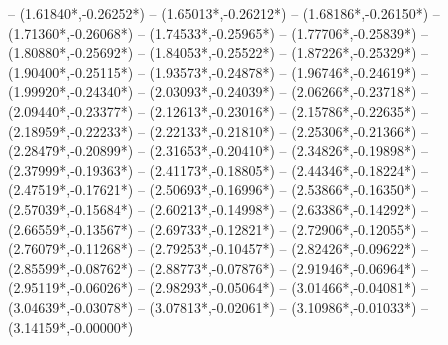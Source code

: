 {	-- ({1.61840*\dx},{-0.26252*\dy})
	-- ({1.65013*\dx},{-0.26212*\dy})
	-- ({1.68186*\dx},{-0.26150*\dy})
	-- ({1.71360*\dx},{-0.26068*\dy})
	-- ({1.74533*\dx},{-0.25965*\dy})
	-- ({1.77706*\dx},{-0.25839*\dy})
	-- ({1.80880*\dx},{-0.25692*\dy})
	-- ({1.84053*\dx},{-0.25522*\dy})
	-- ({1.87226*\dx},{-0.25329*\dy})
	-- ({1.90400*\dx},{-0.25115*\dy})
	-- ({1.93573*\dx},{-0.24878*\dy})
	-- ({1.96746*\dx},{-0.24619*\dy})
	-- ({1.99920*\dx},{-0.24340*\dy})
	-- ({2.03093*\dx},{-0.24039*\dy})
	-- ({2.06266*\dx},{-0.23718*\dy})
	-- ({2.09440*\dx},{-0.23377*\dy})
	-- ({2.12613*\dx},{-0.23016*\dy})
	-- ({2.15786*\dx},{-0.22635*\dy})
	-- ({2.18959*\dx},{-0.22233*\dy})
	-- ({2.22133*\dx},{-0.21810*\dy})
	-- ({2.25306*\dx},{-0.21366*\dy})
	-- ({2.28479*\dx},{-0.20899*\dy})
	-- ({2.31653*\dx},{-0.20410*\dy})
	-- ({2.34826*\dx},{-0.19898*\dy})
	-- ({2.37999*\dx},{-0.19363*\dy})
	-- ({2.41173*\dx},{-0.18805*\dy})
	-- ({2.44346*\dx},{-0.18224*\dy})
	-- ({2.47519*\dx},{-0.17621*\dy})
	-- ({2.50693*\dx},{-0.16996*\dy})
	-- ({2.53866*\dx},{-0.16350*\dy})
	-- ({2.57039*\dx},{-0.15684*\dy})
	-- ({2.60213*\dx},{-0.14998*\dy})
	-- ({2.63386*\dx},{-0.14292*\dy})
	-- ({2.66559*\dx},{-0.13567*\dy})
	-- ({2.69733*\dx},{-0.12821*\dy})
	-- ({2.72906*\dx},{-0.12055*\dy})
	-- ({2.76079*\dx},{-0.11268*\dy})
	-- ({2.79253*\dx},{-0.10457*\dy})
	-- ({2.82426*\dx},{-0.09622*\dy})
	-- ({2.85599*\dx},{-0.08762*\dy})
	-- ({2.88773*\dx},{-0.07876*\dy})
	-- ({2.91946*\dx},{-0.06964*\dy})
	-- ({2.95119*\dx},{-0.06026*\dy})
	-- ({2.98293*\dx},{-0.05064*\dy})
	-- ({3.01466*\dx},{-0.04081*\dy})
	-- ({3.04639*\dx},{-0.03078*\dy})
	-- ({3.07813*\dx},{-0.02061*\dy})
	-- ({3.10986*\dx},{-0.01033*\dy})
	-- ({3.14159*\dx},{-0.00000*\dy})
}
